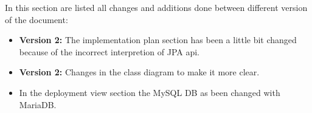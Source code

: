 In this section are listed all changes and additions done between different version of the document:
\begin{itemize}
	\item \textbf{Version 2:} The implementation plan section has been a little bit changed because of the incorrect interpretion of JPA api.
	\item \textbf{Version 2:} Changes in the class diagram to make it more clear.
	\item {} In the deployment view section the MySQL DB as been changed with MariaDB.
\end{itemize}
